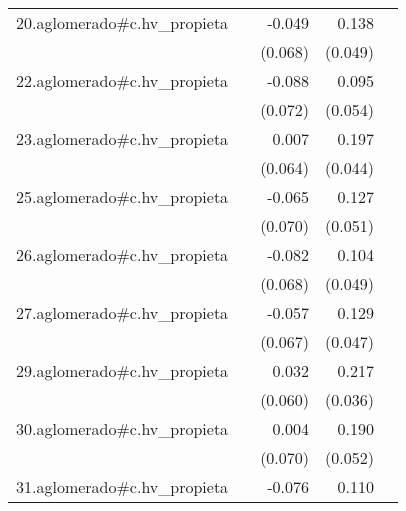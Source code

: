{\begin{longtable}{l*{4}{D{.}{.}{-1}}}
\addlinespace
20.aglomerado#c.hv\_propieta&                     &      -0.049         &       0.138\sym{**} &                     \\
            &                     &     (0.068)         &     (0.049)         &                     \\
\addlinespace
22.aglomerado#c.hv\_propieta&                     &      -0.088         &       0.095         &                     \\
            &                     &     (0.072)         &     (0.054)         &                     \\
\addlinespace
23.aglomerado#c.hv\_propieta&                     &       0.007         &       0.197\sym{***}&                     \\
            &                     &     (0.064)         &     (0.044)         &                     \\
\addlinespace
25.aglomerado#c.hv\_propieta&                     &      -0.065         &       0.127\sym{*}  &                     \\
            &                     &     (0.070)         &     (0.051)         &                     \\
\addlinespace
26.aglomerado#c.hv\_propieta&                     &      -0.082         &       0.104\sym{*}  &                     \\
            &                     &     (0.068)         &     (0.049)         &                     \\
\addlinespace
27.aglomerado#c.hv\_propieta&                     &      -0.057         &       0.129\sym{**} &                     \\
            &                     &     (0.067)         &     (0.047)         &                     \\
\addlinespace
29.aglomerado#c.hv\_propieta&                     &       0.032         &       0.217\sym{***}&                     \\
            &                     &     (0.060)         &     (0.036)         &                     \\
\addlinespace
30.aglomerado#c.hv\_propieta&                     &       0.004         &       0.190\sym{***}&                     \\
            &                     &     (0.070)         &     (0.052)         &                     \\
\addlinespace
31.aglomerado#c.hv\_propieta&                     &      -0.076         &       0.110\sym{*}  &                     \\

\end{longtable}}
